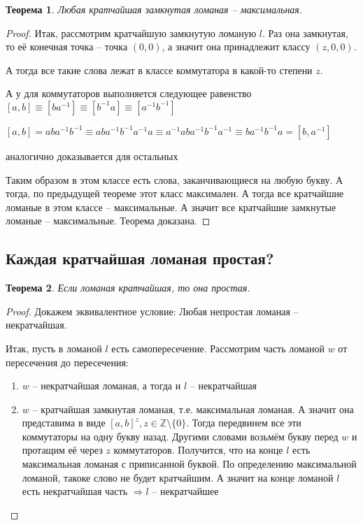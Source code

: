 \documentclass[12pt,a4paper, flushleft]{article}
\newtheorem{Th}{Теорема}[section]
\begin{document}
\begin{Th}
	Любая кратчайшая замкнутая ломаная -- максимальная.
\end{Th}
\begin{proof}
	Итак, рассмотрим кратчайшую замкнутую ломаную $l$. Раз она замкнутая, то её конечная точка -- точка $(0, 0)$, а значит она принадлежит классу $(z, 0, 0)$. 	
	
	А тогда все такие слова лежат в классе коммутатора в какой-то степени $z$.
	
	А у для коммутаторов выполняется следующее равенство $[a, b] \equiv [ba^{-1}] \equiv [b^{-1}a]\equiv [a^{-1}b^{-1}]$
	
	$[a, b] = aba^{-1}b^{-1}\equiv aba^{-1}b^{-1}a^{-1}a\equiv a^{-1}aba^{-1}b^{-1}a^{-1}\equiv ba^{-1}b^{-1}a = [b, a^{-1}]$
	
	аналогично доказывается для остальных
	
	Таким образом в этом классе есть слова, заканчивающиеся на любую букву. А тогда, по предыдущей теореме этот класс максимален. А тогда все кратчайшие ломаные в этом классе -- максимальные. А значит все кратчайшие замкнутые ломаные -- максимальные. Теорема доказана.	
\end{proof}

\subsection{Каждая кратчайшая ломаная простая?}

\begin{Th}
	Если ломаная кратчайшая, то она простая. 
\end{Th}
\begin{proof}
	Докажем эквивалентное условие: Любая непростая ломаная -- некратчайшая.
	
	Итак, пусть в ломаной $l$ есть самопересечение. Рассмотрим часть ломаной  $w$ от пересечения до пересечения:
	\begin{enumerate}
		\item $w$ -- некратчайшая ломаная, а тогда и $l$ -- некратчайшая
		\item $w$ -- кратчайшая замкнутая ломаная, т.е. максимальная ломаная. А значит она представима в виде $[a, b]^z, z\in \mathds{Z}\setminus \{0\}$. Тогда передвинем все эти коммутаторы на одну букву назад. Другими словами возьмём букву перед  $w$ и протащим её через $z$ коммутаторов. Получится, что на конце $l$ есть максимальная ломаная с приписанной буквой. По определению максимальной ломаной, такоке слово не будет кратчайшим. А значит на конце ломаной $l$ есть некратчайшая часть $\Rightarrow l$ -- некратчайшее
	\end{enumerate}
\end{proof}
\end{document}
